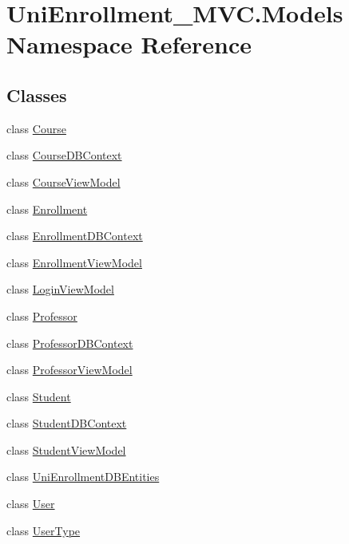 \hypertarget{namespace_uni_enrollment___m_v_c_1_1_models}{}\section{Uni\+Enrollment\+\_\+\+M\+V\+C.\+Models Namespace Reference}
\label{namespace_uni_enrollment___m_v_c_1_1_models}
\subsection*{Classes}
\begin{DoxyCompactItemize}
\item 
class \hyperlink{class_uni_enrollment___m_v_c_1_1_models_1_1_course}{Course}
\item 
class \hyperlink{class_uni_enrollment___m_v_c_1_1_models_1_1_course_d_b_context}{Course\+D\+B\+Context}
\item 
class \hyperlink{class_uni_enrollment___m_v_c_1_1_models_1_1_course_view_model}{Course\+View\+Model}
\item 
class \hyperlink{class_uni_enrollment___m_v_c_1_1_models_1_1_enrollment}{Enrollment}
\item 
class \hyperlink{class_uni_enrollment___m_v_c_1_1_models_1_1_enrollment_d_b_context}{Enrollment\+D\+B\+Context}
\item 
class \hyperlink{class_uni_enrollment___m_v_c_1_1_models_1_1_enrollment_view_model}{Enrollment\+View\+Model}
\item 
class \hyperlink{class_uni_enrollment___m_v_c_1_1_models_1_1_login_view_model}{Login\+View\+Model}
\item 
class \hyperlink{class_uni_enrollment___m_v_c_1_1_models_1_1_professor}{Professor}
\item 
class \hyperlink{class_uni_enrollment___m_v_c_1_1_models_1_1_professor_d_b_context}{Professor\+D\+B\+Context}
\item 
class \hyperlink{class_uni_enrollment___m_v_c_1_1_models_1_1_professor_view_model}{Professor\+View\+Model}
\item 
class \hyperlink{class_uni_enrollment___m_v_c_1_1_models_1_1_student}{Student}
\item 
class \hyperlink{class_uni_enrollment___m_v_c_1_1_models_1_1_student_d_b_context}{Student\+D\+B\+Context}
\item 
class \hyperlink{class_uni_enrollment___m_v_c_1_1_models_1_1_student_view_model}{Student\+View\+Model}
\item 
class \hyperlink{class_uni_enrollment___m_v_c_1_1_models_1_1_uni_enrollment_d_b_entities}{Uni\+Enrollment\+D\+B\+Entities}
\item 
class \hyperlink{class_uni_enrollment___m_v_c_1_1_models_1_1_user}{User}
\item 
class \hyperlink{class_uni_enrollment___m_v_c_1_1_models_1_1_user_type}{User\+Type}
\end{DoxyCompactItemize}

